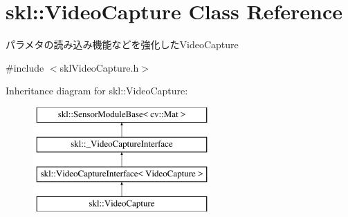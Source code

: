 \hypertarget{classskl_1_1_video_capture}{}\section{skl\+:\+:Video\+Capture Class Reference}
\label{classskl_1_1_video_capture}


パラメタの読み込み機能などを強化した\+Video\+Capture  




{\ttfamily \#include $<$skl\+Video\+Capture.\+h$>$}

Inheritance diagram for skl\+:\+:Video\+Capture\+:\begin{figure}[H]
\begin{center}
\leavevmode
\includegraphics[height=4.000000cm]{classskl_1_1_video_capture}
\end{center}
\end{figure}
